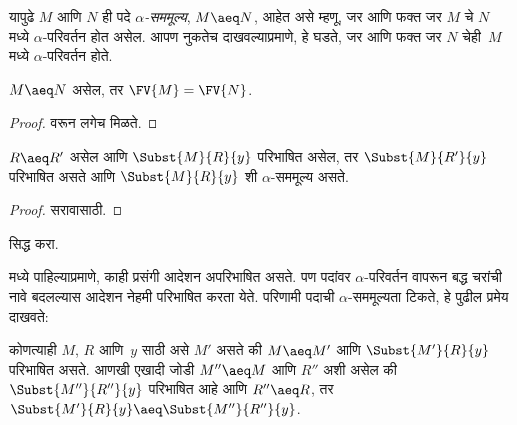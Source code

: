 \documentclass[../../../include/open-logic-section]{subfiles}
\begin{document}
यापुढे $M$ आणि $N$ ही पदे \emph{$\alpha$-सममूल्य},
$M \aeq N$, आहेत असे म्हणू, जर आणि फक्त जर $M$ चे $N$ मध्ये
$\alpha$-परिवर्तन होत असेल. आपण नुकतेच दाखवल्याप्रमाणे,
हे घडते, जर आणि फक्त जर $N$ चेही~$M$ मध्ये
$\alpha$-परिवर्तन होते.

\begin{thm}
  $M \aeq N$ असेल, तर $\FV{M} = \FV{N}$.
\end{thm}

\begin{proof}
   वरून लगेच मिळते.
\end{proof}

\begin{lem}
  $R \aeq R'$ असेल आणि $\Subst{M}{R}{y}$ परिभाषित
  असेल, तर $\Subst{M}{R'}{y}$ परिभाषित असते आणि
  $\Subst{M}{R}{y}$ शी $\alpha$-सममूल्य असते.
\end{lem}

\begin{proof}
  सरावासाठी.
\end{proof}

\begin{prob}
   सिद्ध करा.
\end{prob}

 मध्ये पाहिल्याप्रमाणे, काही प्रसंगी
आदेशन अपरिभाषित असते. पण पदांवर $\alpha$-परिवर्तन
वापरून बद्ध चरांची नावे बदलल्यास आदेशन नेहमी परिभाषित
करता येते. परिणामी पदाची $\alpha$-सममूल्यता टिकते,
हे पुढील प्रमेय दाखवते:

\begin{thm}
  कोणत्याही $M$, $R$ आणि~$y$ साठी असे $M'$ असते की
  $M \aeq M'$ आणि $\Subst{M'}{R}{y}$ परिभाषित असते.
  आणखी एखादी जोडी $M'' \aeq M$ आणि $R''$ अशी असेल
  की $\Subst{M''}{R''}{y}$ परिभाषित आहे आणि $R'' \aeq R$,
  तर $\Subst{M'}{R}{y} \aeq \Subst{M''}{R''}{y}$.
\end{thm}
\end{document}
